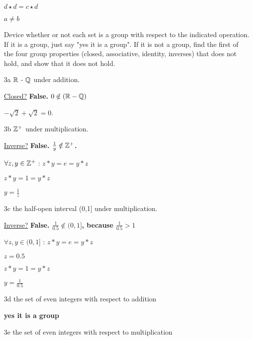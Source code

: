 $d \star d =  c \star d$

$a\neq b$





\begin{question}{3}
Device whether or not each set is a group with respect to the indicated operation. If it is a group, just say "yes it is a group". If it is not a group, find the first of the four group properties (closed, associative, identity, inverses) that does not hold, and show that it does not hold.
\end{question}

\begin{question}{3a}
$\mathbb{R}$ - $\mathbb{Q}$ under addition.
\end{question}

\underline{Closed?} \textbf{False. $0 \notin (\mathbb{R}-\mathbb{Q})$}

$-\sqrt{2} + \sqrt{2} = 0$. 


\begin{question}{3b}
$\mathbb{Z}^+$ under multiplication.
\end{question}

\underline{Inverse?} \textbf{False. $\frac{1}{y} \notin \mathbb{Z}^+$.}

$\forall z,y \in \mathbb{Z}^+$ : $z * y = e = y * z$

$z * y = 1 = y * z$

$y = \frac{1}{z}$


\begin{question}{3c}
the half-open interval (0,1] under multiplication.
\end{question}

\underline{Inverse?} \textbf{False. $\frac{1}{0.5} \notin (0,1]$, because $\frac{1}{0.5} > 1$}

$\forall z,y \in (0,1]$ : $z * y = e = y * z$

$z=0.5$

$z * y = 1 = y * z$

$y = \frac{1}{0.5}$


\begin{question}{3d}
the set of even integers with respect to addition
\end{question}

\textbf{yes it is a group}

\begin{question}{3e}
the set of even integers with respect to multiplication
\end{question}

